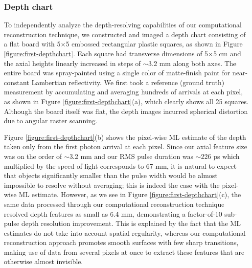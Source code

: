 \subsubsection{Depth chart}

To independently analyze the depth-resolving capabilities of our computational reconstruction technique, we constructed and imaged a depth chart consisting of a flat board with 5$\times$5 embossed rectangular plastic squares, as shown in Figure \ref{figure:first-depthchart}. Each square had transverse dimensions of 5$\times$5 cm and the axial heights linearly increased in steps of $\sim$3.2 mm along both axes. The entire board was spray-painted using a single color of matte-finish paint for near-constant Lambertian reflectivity. We first took a reference (ground truth) measurement by accumulating and averaging hundreds of arrivals at each pixel, as shown in Figure \ref{figure:first-depthchart}(a), which clearly shows all 25 squares. Although the board itself was flat, the depth images incurred spherical distortion due to angular raster scanning.

Figure \ref{figure:first-depthchart}(b) shows the pixel-wise ML estimate of the depth taken only from the first photon arrival at each pixel. Since our axial feature size was on the order of $\sim$3.2 mm and our RMS pulse duration was $\sim$226 ps which multiplied by the speed of light corresponds to 67 mm, it is natural to expect that objects significantly smaller than the pulse width would be almost impossible to resolve without averaging; this is indeed the case with the pixel-wise ML estimate. However, as we see in Figure \ref{figure:first-depthchart}(c), the same data processed through our computational reconstruction technique resolved depth features as small as 6.4 mm, demonstrating a factor-of-10 sub-pulse depth resolution improvement. This is explained by the fact that the ML estimates do not take into account spatial regularity, whereas our computational reconstruction approach promotes smooth surfaces with few sharp transitions, making use of data from several pixels at once to extract these features that are otherwise almost invisible.

